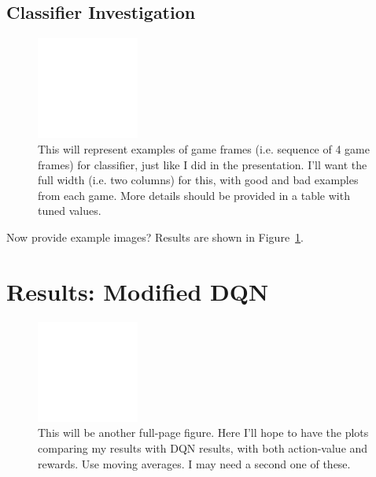 \documentclass[letterpaper, 10pt, conference]{ieeeconf}
\begin{document}
\subsection{Classifier Investigation}

\begin{figure}[t]
\centering
\includegraphics[width=0.30\textwidth]{figures/empty.png}
\caption{\footnotesize
This will represent examples of game frames (i.e. sequence of 4 game frames) for
classifier, just like I did in the presentation. I'll want the full width (i.e.
two columns) for this, with good and bad examples from each game. More details
should be provided in a table with tuned values.
}
\label{fig:example_game_frames}
\end{figure}

Now provide example images? Results are shown in
Figure~\ref{fig:example_game_frames}.




\section{Results: Modified DQN}\label{sec:results_p2}

\begin{figure}[t]
\centering
\includegraphics[width=0.30\textwidth]{figures/empty.png}
\caption{\footnotesize
This will be another full-page figure. Here I'll hope to have the plots
comparing my results with DQN results, with both action-value and rewards. Use
moving averages. I may need a second one of these.
}
\label{fig:human_dqn_performance}
\end{figure}
\end{document}
